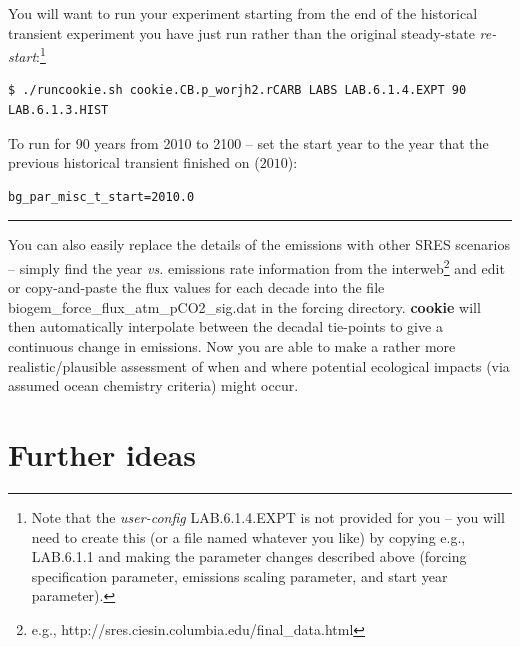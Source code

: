 You will want to run your experiment starting from the end of the historical transient experiment you have just run rather than the original steady-state \textit{re-start}:\footnote{Note that the \textit{user-config} \textsf{\footnotesize LAB.6.1.4.EXPT } is not provided for you – you will need to create this (or a file named whatever you like) by copying e.g., \textsf{\footnotesize LAB.6.1.1} and making the parameter changes described above (forcing specification parameter, emissions scaling parameter, and start year parameter).}
\vspace{-1mm}\small\begin{verbatim}
$ ./runcookie.sh cookie.CB.p_worjh2.rCARB LABS LAB.6.1.4.EXPT 90 LAB.6.1.3.HIST
\end{verbatim}\normalsize\vspace{-1mm}
To run for 90 years from 2010 to 2100 -- set the start year to the year that the previous historical transient finished on (\(2010\)):
\vspace{-1mm}\small\begin{verbatim}
bg_par_misc_t_start=2010.0
\end{verbatim}\normalsize\vspace{-2mm}

\vspace{1mm} \noindent\rule{4cm}{0.1mm} \vspace{2mm}

\noindent You can also easily replace the details of the emissions with other SRES scenarios – simply find the year \textit{vs.} emissions rate information from the interweb\footnote{e.g., http://sres.ciesin.columbia.edu/final\_data.html} and edit or copy-and-paste the flux values for each decade into the file \textsf{\footnotesize biogem\_force\_flux\_atm\_pCO2\_sig.dat} in the forcing directory.\textbf{ cookie} will then automatically interpolate between the decadal tie-points to give a continuous change in emissions. Now you are able to make a rather more realistic/plausible assessment of when and where potential ecological impacts (via assumed ocean chemistry criteria) might occur.

\newpage

\section{Further ideas}


